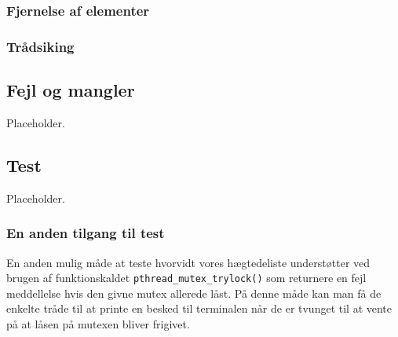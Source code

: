 \documentclass[main.tex]{subfile}
\begin{document}
\subsubsection{Fjernelse af elementer}

\subsubsection{Trådsiking}

\subsection{Fejl og mangler}
Placeholder.\\

\subsection{Test}\label{sec:del2_test}
Placeholder.\\

\subsubsection{En anden tilgang til test}
En anden mulig måde at teste hvorvidt vores hægtedeliste understøtter ved brugen af funktionskaldet \texttt{pthread\_mutex\_trylock()} som returnere en fejl meddellelse hvis den givne mutex allerede låst. På denne måde kan man få de enkelte tråde til at printe en besked til terminalen når de er tvunget til at vente på at låsen på mutexen bliver frigivet. 
\end{document}
